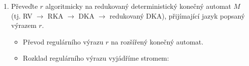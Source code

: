 \documentclass[a4paper,11pt]{article}[24.3.2010]
\begin{document}
\begin{enumerate}
  \begin{enumerate}
    \item Převeďte $r$ algoritmicky na redukovaný deterministický konečný automat $M$ (tj. RV $\rightarrow$ RKA $\rightarrow$ DKA $\rightarrow$ redukovaný DKA), přijímající jazyk popsaný výrazem $r$.
    \begin{itemize}
        \item Převod regulárního výrazu $r$ na rozšířený konečný automat.
        \item Rozklad regulárního výrazu vyjádříme stromem:
        \begin{figure}[h!]
        \begin{center}
        \end{center}
        \end{figure}
        \newpage


\end{itemize}
\end{enumerate}
\end{enumerate}
\end{document}
